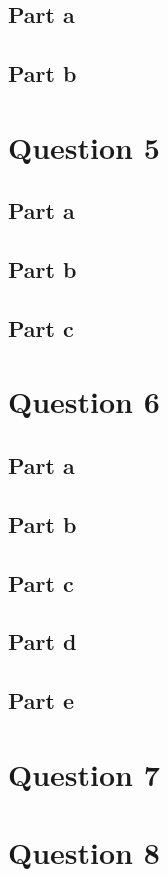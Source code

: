 \documentclass[a3paper 12pt]{article}
\begin{document}
\subsection{Part a}

\subsection{Part b}

\section{Question 5}
\subsection{Part a}

\subsection{Part b}

\subsection{Part c}

\section{Question 6}
\subsection{Part a}

\subsection{Part b}

\subsection{Part c}

\subsection{Part d}

\subsection{Part e}

\section{Question 7}

\section{Question 8}
\end{document}
